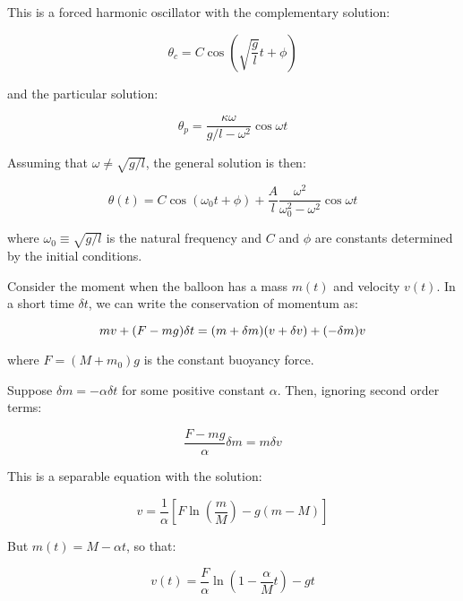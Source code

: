 \documentclass[12pt]{article}
\begin{document}
This is a forced harmonic oscillator with the complementary solution:

\begin{equation}
    \theta_{c} = C \cos{\left( \sqrt{\frac{g}{l}} t + \phi \right)}
\end{equation}

and the particular solution:

\begin{equation}
    \theta_{p} = \frac{\kappa \omega}{g/l - \omega^{2}} \cos{\omega t}
\end{equation}

Assuming that $\omega \neq \sqrt{g/l}$, the general solution is then:

\begin{equation}
    \theta(t) = C \cos{\left( \omega_{0} t + \phi \right)} + \frac{A}{l} \frac{\omega^{2}}{\omega_{0}^{2} - \omega^{2}} \cos{\omega t}
\end{equation}

where $\omega_{0} \equiv \sqrt{g/l}$ is the natural frequency and $C$ and $\phi$ are constants determined by the initial conditions.



Consider the moment when the balloon has a mass $m(t)$ and velocity $v(t)$. In a short time $\delta t$, we can write the conservation of momentum as:

\begin{equation}
    mv + (F - mg) \delta t = (m + \delta m)(v + \delta v) + (-\delta m)v \\
\end{equation}

where $F = (M + m_{0})g$ is the constant buoyancy force.

Suppose $\delta m = -\alpha \delta t$ for some positive constant $\alpha$. Then, ignoring second order terms:

\begin{equation}
    \frac{F - mg}{\alpha} \delta m = m \delta v 
\end{equation}

This is a separable equation with the solution:

\begin{equation}
    v = \frac{1}{\alpha} \left[ F \ln{\left( \frac{m}{M} \right)} - g (m - M)\right]
\end{equation}

But $m(t) = M - \alpha t$, so that:

\begin{equation}
    v(t) = \frac{F}{\alpha} \ln{\left( 1 - \frac{\alpha}{M}t \right)} - gt
\end{equation}
\end{document}

